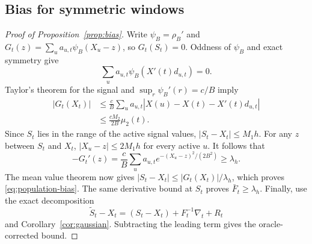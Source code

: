 \documentclass[11pt]{article}
\begin{document}
\subsection{Bias for symmetric windows}

\begin{proof}[Proof of Proposition~\ref{prop:bias}]
Write \(\psi_B=\rho_B'\) and
\(G_t(z)=\sum_u a_{u,t}\psi_B(X_u-z)\), so \(G_t(S_t)=0\).
Oddness of \(\psi_B\) and exact symmetry give
\[
  \sum_u a_{u,t}\psi_B(X'(t)d_{u,t})=0.
\]
Taylor's theorem for the signal and \(\sup_r\psi_B'(r)=c/B\) imply
\begin{align*}
  |G_t(X_t)|
  &\leq\frac cB\sum_u a_{u,t}
      |X(u)-X(t)-X'(t)d_{u,t}|\\
  &\leq\frac{cM_2}{2B}\mu_2(t).
\end{align*}
Since \(S_t\) lies in the range of the active signal values,
\(|S_t-X_t|\leq M_1h\).  For any \(z\) between \(S_t\) and \(X_t\),
\(|X_u-z|\leq2M_1h\) for every active \(u\).  It follows that
\[
  -G_t'(z)=\frac cB\sum_u a_{u,t}e^{-(X_u-z)^2/(2B^2)}
           \geq\lambda_h.
\]
The mean value theorem now gives
\(|S_t-X_t|\leq|G_t(X_t)|/\lambda_h\), which proves
\eqref{eq:population-bias}.  The same derivative bound at \(S_t\) proves
\(\bar F_t\geq\lambda_h\).  Finally, use the exact decomposition
\[
  \widetilde S_t-X_t=(S_t-X_t)+F_t^{-1}\nabla_t+R_t
\]
and Corollary~\ref{cor:gaussian}.  Subtracting the leading term gives the
oracle-corrected bound.
\end{proof}
\end{document}
